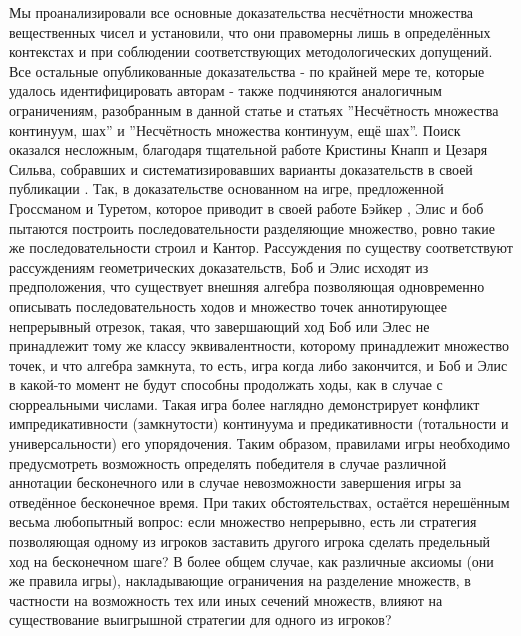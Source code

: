 \documentclass[12pt]{article}
\begin{document}
Мы проанализировали все основные доказательства несчётности множества вещественных чисел и установили, что они правомерны лишь в определённых контекстах и при соблюдении соответствующих методологических допущений. Все остальные опубликованные доказательства - по крайней мере те, которые удалось идентифицировать авторам - также подчиняются аналогичным ограничениям, разобранным в данной статье и статьях ''Несчётность множества континуум, шах'' и ''Несчётность множества континуум, ещё шах''. Поиск оказался несложным, благодаря тщательной работе Кристины Кнапп и Цезаря Сильва, собравших и систематизировавших варианты доказательств в своей публикации \cite{proof-list}. Так, в доказательстве основанном на игре, предложенной Гроссманом и Туретом, которое приводит в своей работе Бэйкер \cite{baker}, Элис и боб пытаются построить последовательности разделяющие множество, ровно такие же последовательности строил и Кантор. Рассуждения по существу соответствуют рассуждениям геометрических доказательств, Боб и Элис исходят из предположения, что существует внешняя алгебра позволяющая одновременно описывать последовательность ходов и множество точек аннотирующее непрерывный отрезок, такая, что завершающий ход Боб или Элес не принадлежит тому же классу эквивалентности, которому принадлежит множество точек, и что алгебра замкнута, то есть, игра когда либо закончится, и Боб и Элис в какой-то момент не будут способны продолжать ходы, как в случае с сюрреальными числами. Такая игра более наглядно демонстрирует конфликт импредикативности (замкнутости) континуума и предикативности (тотальности и универсальности) его упорядочения. Таким образом, правилами игры необходимо предусмотреть возможность определять победителя в случае различной аннотации бесконечного или в случае невозможности завершения игры за отведённое бесконечное время. При таких обстоятельствах, остаётся нерешённым весьма любопытный вопрос: если множество непрерывно, есть ли стратегия позволяющая одному из игроков заставить другого игрока сделать предельный ход на бесконечном шаге? В более общем случае, как различные аксиомы (они же правила игры), накладывающие ограничения на разделение множеств, в частности на возможность тех или иных сечений множеств, влияют на существование выигрышной стратегии для одного из игроков?
\end{document}
